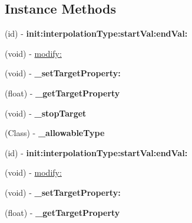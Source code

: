 \subsection*{Instance Methods}
\begin{DoxyCompactItemize}
\item 
\mbox{\label{interfaceCDPropertyModifier_a9abcff3fa09244e63f37da6294127605}} 
(id) -\/ {\bfseries init\+:interpolation\+Type\+:start\+Val\+:end\+Val\+:}
\item 
(void) -\/ \hyperlink{interfaceCDPropertyModifier_a8c2d8d098bc743ad13d80271a03f15d6}{modify\+:}
\item 
\mbox{\label{interfaceCDPropertyModifier_ab5661c86cd671b7393e7012d0e08a355}} 
(void) -\/ {\bfseries \+\_\+set\+Target\+Property\+:}
\item 
\mbox{\label{interfaceCDPropertyModifier_a9aab6ce1e0e21603340230375fb8133e}} 
(float) -\/ {\bfseries \+\_\+get\+Target\+Property}
\item 
\mbox{\label{interfaceCDPropertyModifier_ad4db2857a169bb8abf15b1596a5407de}} 
(void) -\/ {\bfseries \+\_\+stop\+Target}
\item 
\mbox{\label{interfaceCDPropertyModifier_a8f4ee3a547824a5d2045bfbd7ed5474e}} 
(Class) -\/ {\bfseries \+\_\+allowable\+Type}
\item 
\mbox{\label{interfaceCDPropertyModifier_a9abcff3fa09244e63f37da6294127605}} 
(id) -\/ {\bfseries init\+:interpolation\+Type\+:start\+Val\+:end\+Val\+:}
\item 
(void) -\/ \hyperlink{interfaceCDPropertyModifier_a8c2d8d098bc743ad13d80271a03f15d6}{modify\+:}
\item 
\mbox{\label{interfaceCDPropertyModifier_ab5661c86cd671b7393e7012d0e08a355}} 
(void) -\/ {\bfseries \+\_\+set\+Target\+Property\+:}
\item 
\mbox{\label{interfaceCDPropertyModifier_a9aab6ce1e0e21603340230375fb8133e}} 
(float) -\/ {\bfseries \+\_\+get\+Target\+Property}
\item 

\end{DoxyCompactItemize}
